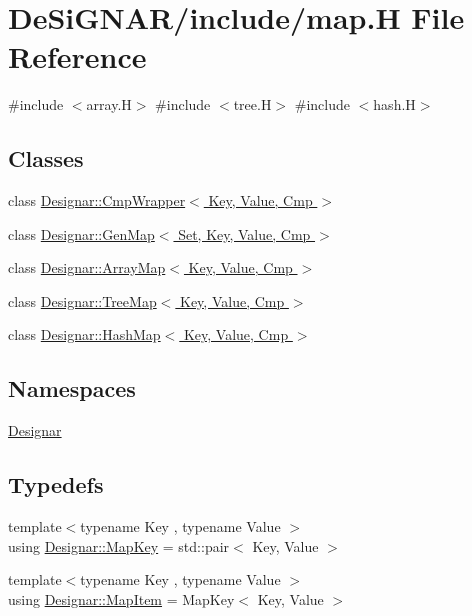 \hypertarget{map_8_h}{}\section{De\+Si\+G\+N\+A\+R/include/map.H File Reference}
\label{map_8_h}
{\ttfamily \#include $<$array.\+H$>$}\newline
{\ttfamily \#include $<$tree.\+H$>$}\newline
{\ttfamily \#include $<$hash.\+H$>$}\newline
\subsection*{Classes}
\begin{DoxyCompactItemize}
\item 
class \hyperlink{class_designar_1_1_cmp_wrapper}{Designar\+::\+Cmp\+Wrapper$<$ Key, Value, Cmp $>$}
\item 
class \hyperlink{class_designar_1_1_gen_map}{Designar\+::\+Gen\+Map$<$ Set, Key, Value, Cmp $>$}
\item 
class \hyperlink{class_designar_1_1_array_map}{Designar\+::\+Array\+Map$<$ Key, Value, Cmp $>$}
\item 
class \hyperlink{class_designar_1_1_tree_map}{Designar\+::\+Tree\+Map$<$ Key, Value, Cmp $>$}
\item 
class \hyperlink{class_designar_1_1_hash_map}{Designar\+::\+Hash\+Map$<$ Key, Value, Cmp $>$}
\end{DoxyCompactItemize}
\subsection*{Namespaces}
\begin{DoxyCompactItemize}
\item 
 \hyperlink{namespace_designar}{Designar}
\end{DoxyCompactItemize}
\subsection*{Typedefs}
\begin{DoxyCompactItemize}
\item 
{\footnotesize template$<$typename Key , typename Value $>$ }\\using \hyperlink{namespace_designar_a7394b1b25278abf7211e77b91eb5204f}{Designar\+::\+Map\+Key} = std\+::pair$<$ Key, Value $>$
\item 
{\footnotesize template$<$typename Key , typename Value $>$ }\\using \hyperlink{namespace_designar_abc6ea5602461a15100a645d1f0e5cbcb}{Designar\+::\+Map\+Item} = Map\+Key$<$ Key, Value $>$
\end{DoxyCompactItemize}
